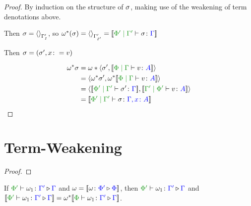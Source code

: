 \documentclass{report}
\begin{document}
\begin{framed}
    \begin{proof}
        By induction on the structure of $\sigma$, making use of the weakening of term denotations above.
        
        Then $\sigma = \left\langle\right\rangle_{\Gamma'_{I}}$, so $\w\star(\si) = \term{\G'_{I'}} = \deno{\etyperelation{\P'}{\G'}{\si}{\G}}$
        
        Then $\sigma = (\sigma',x\colon= v)$
        
        \begin{align*}
            \w\star\si & = \w*\pr{\si'}{\deno{\gpetyperelation{v}{A}}}\\
            & = \pr{\w\star\si'}{\w\star\deno{\gpetyperelation{v}{A}}}\\
            &=\pr{\deno{\etyperelation{\P'}{\G'}{\si'}{\G}}}{\deno{\etyperelation{\G'}{\P'}{v}{A}}}\\
            &=\deno{\etyperelation{\P'}{\G'}{\si}{\gax}}
        \end{align*}
    \end{proof}
\end{framed}


\section{Term-Weakening}


\begin{theorem}
\end{theorem}


\begin{framed}
    \begin{proof}
        
    \end{proof}
\end{framed}


\begin{theorem}
    If $\ewrel{\P'}{\w_1}{\G'}{\G}$ and $\omega = {\bf [\![}\omega \colon {\color{blue}\Phi'} \triangleright {\color {blue} \Phi}{\bf ]\!]}$, then $\ewrel{\P'}{\w_1}{\G'}{\G}$ and $\deno{\ewrel{\P'}{\w_1}{\G'}{\G}} = \w\star\deno{\ewrel{\P}{\w_1}{\G'}{\G}}$.
\end{theorem}
\end{document}
